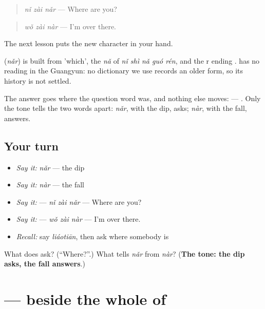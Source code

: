 \begin{quote}
\textbf{} \emph{nǐ zài nǎr} — Where are you?
\end{quote}

\begin{quote}
\textbf{} \emph{wǒ zài nàr} — I'm over there.
\end{quote}

The next lesson puts the new character in your hand.

\begin{cousinweb}
\textbf{} (\emph{nǎr}) is built from  'which', the \emph{nǎ} of \emph{nǐ shì nǎ guó rén}, and the r ending .  has no reading in the Guangyun: no dictionary we use records an older form, so its history is not settled.
\end{cousinweb}

\begin{grammarlens}[title={What you've built}]
The answer goes where the question word was, and nothing else moves:  — . Only the tone tells the two words apart: \emph{nǎr}, with the dip, asks; \emph{nàr}, with the fall, answers.
\end{grammarlens}

\subsection*{Your turn}
\begin{itemize}
\raggedright
  \item \emph{Say it:} \emph{nǎr} — the dip
  \item \emph{Say it:} \emph{nàr} — the fall
  \item \emph{Say it:}  — \emph{nǐ zài nǎr} — Where are you?
  \item \emph{Say it:}  — \emph{wǒ zài nàr} — I'm over there.
  \item \emph{Recall:} say \emph{liáotiān}, then ask where somebody is
\end{itemize}

\begin{tcolorbox}[breakable,colback=teal!4,colframe=teal!35!black,title={Before you move on}]
What does  ask? (\textquotedblleft{}Where?\textquotedblright{}.) What tells \emph{nǎr} from \emph{nàr}? (\textbf{The tone: the dip asks, the fall answers}.)
\end{tcolorbox}
\section[\texorpdfstring{\zh{哪} (nǎ)}{哪 (nǎ)}]{ —  beside the whole of }

